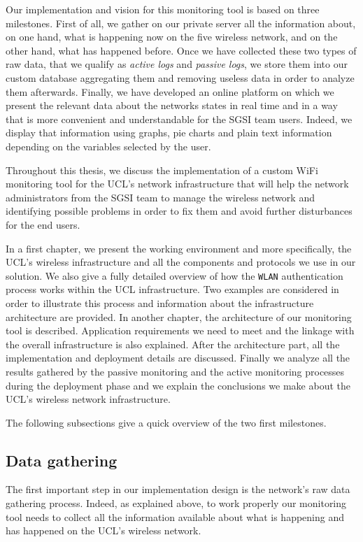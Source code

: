 Our implementation and vision for this monitoring tool is based on three milestones. First of all, we gather on our private server all the information about, on one hand, what is happening now on the five wireless network, and on the other hand, what has happened before. Once we have collected these two types of raw data, that we qualify as \textit{active logs} and \textit{passive logs}, we store them into our custom database aggregating them and removing useless data in order to analyze them afterwards. Finally, we have developed an online platform on which we present the relevant data about the networks states in real time and in a way that is more convenient and understandable for the SGSI team users. Indeed, we display that information using graphs, pie charts and plain text information depending on the variables selected by the user.

Throughout this thesis, we discuss the implementation of a custom WiFi monitoring tool for the UCL's network infrastructure that will help the network administrators from the SGSI team to manage the wireless network and identifying possible problems in order to fix them and avoid further disturbances for the end users. 


In a first chapter, we present the working environment and more specifically, the UCL's wireless infrastructure and all the components and protocols we use in our solution. We also give a fully detailed overview of how the \texttt{WLAN} authentication process works within the UCL infrastructure. Two examples are considered in order to illustrate this process and information about the infrastructure architecture are provided. In another chapter, the architecture of our monitoring tool is described. Application requirements we need to meet and the linkage with the overall infrastructure is also explained. After the architecture part, all the implementation and deployment details are discussed. Finally we analyze all the results gathered by the passive monitoring and the active monitoring processes during the deployment phase and we explain the conclusions we make about the UCL's wireless network infrastructure.


The following subsections give a quick overview of the two first milestones.


\subsection{Data gathering}
The first important step in our implementation design is the network's raw data gathering process. Indeed, as explained above, to work properly our monitoring tool needs to collect all the information available about what is happening and has happened on the UCL's wireless network.

